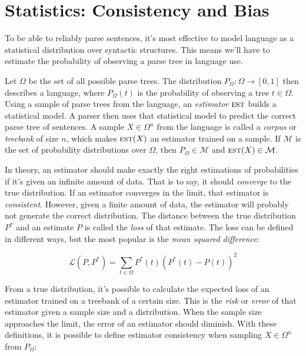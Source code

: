 \section{Statistics: Consistency and Bias}\label{sec:Statistics}


To be able to reliably parse sentences, it's most effective to model language as a statistical distribution over syntactic structures. This means we'll have to estimate the probability of observing a parse tree in language use.

Let $\Omega$ be the set of all possible parse trees. The distribution $P_\Omega: \Omega\rightarrow [0,1]$ then describes a language, where $P_\Omega(t)$ is the probability of observing a tree $t \in \Omega$. Using a sample of parse trees from the language, an \emph{estimator} $\textsc{est}$ builds a statistical model. A parser then uses that statistical model to predict the correct parse tree of sentences.
A sample $X \in \Omega^n$ from the language is called a \emph{corpus} or \emph{treebank} of size $n$, which makes $\textsc{est}(X)$ an estimator trained on a sample. If $\mathcal{M}$ is the set of probability distributions over $\Omega$, then $P_\Omega \in \mathcal{M}$ and $\textsc{est}(X) \in \mathcal{M}$.

In theory, an estimator should make exactly the right estimations of probabilities if it's given an infinite amount of data. That is to say, it should \emph{converge} to the true distribution. If an estimator converges in the limit, that estimator is \emph{consistent}.
However, given a finite amount of data, the estimator will probably not generate the correct distribution. The distance between the true distribution $P^*$ and an estimate $P$ is called the \emph{loss} of that estimate. The loss can be defined in different ways, but the most popular is the \emph{mean squared difference}:

$$ \mathcal{L}(P, P^*) =  \sum_{t \in \Omega} P^*(t) (P^*(t)-P(t))^2$$

From a true distribution, it's possible to calculate the expected loss of an estimator trained on a treebank of a certain size. This is the \emph{risk} or \emph{error} of that estimator given a sample size and a distribution. 
When the sample size approaches the limit, the error of an estimator should diminish. With these definitions, it is possible to define estimator consistency when sampling $X \in \Omega^n$ from $P_\Omega$:

